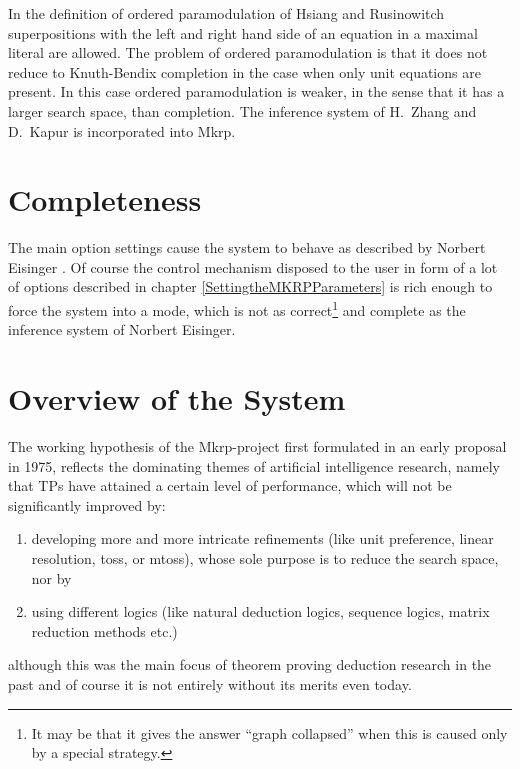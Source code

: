 In the definition of ordered paramodulation of Hsiang and Rusinowitch
superpositions with the left and right hand side of an equation in a
maximal literal are allowed. The problem of ordered paramodulation is
that it does not reduce to Knuth-Bendix completion in the case when
only unit equations are present. In this case ordered paramodulation
is weaker, in the sense that it has a larger search space, than
completion. The inference system of H.\ Zhang and D.\ Kapur is
incorporated into {\sc Mkrp}.

\section{Completeness}
\label{Completenes}

 The main option settings cause 
the system to behave as described by Norbert Eisinger \cite
{Eisinger89}. Of course the control mechanism disposed to the user in
form of a lot of options described in chapter
\ref{SettingtheMKRPParameters} is rich enough to force the system into 
a mode, which is not as correct\footnote{It may be that it gives the answer 
``graph collapsed'' when this is caused
only by a special strategy.} and complete as 
the inference system of Norbert Eisinger.
                                                                       

 \section{Overview of the System}
\label{OverviewoftheSystem} 

The working hypothesis of the {\sc Mkrp}-project first formulated in an early 
proposal in 1975, reflects the dominating themes of artificial intelligence 
research, namely that TPs have attained a certain level 
of performance, which will not be significantly improved by:

\begin{enumerate}
\item developing more and more intricate refinements (like unit
preference, linear resolution, {\sc toss}, or {\sc mtoss}), whose sole
purpose is to reduce the search space, nor by

\item using different logics (like natural deduction logics, 
sequence logics, matrix reduction methods etc.)
\end{enumerate}

although this was the main focus of theorem proving deduction research in 
the past and of course it is 
not entirely without its merits even today. 

